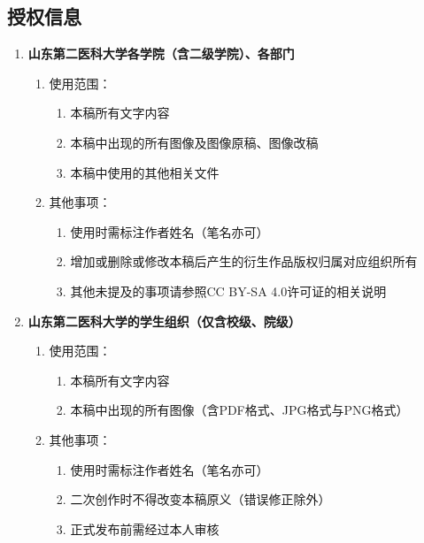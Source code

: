 \subsection[授权信息]{授权信息}
\begin{enumerate}
    \item \textbf{山东第二医科大学各学院（含二级学院）、各部门}
          \begin{enumerate}
              \item 使用范围：
                    \begin{enumerate}
                        \item 本稿所有文字内容
                        \item 本稿中出现的所有图像及图像原稿、图像改稿
                        \item 本稿中使用的其他相关文件
                    \end{enumerate}
              \item 其他事项：
                    \begin{enumerate}
                        \item 使用时需标注作者姓名（笔名亦可）
                        \item 增加或删除或修改本稿后产生的衍生作品版权归属对应组织所有
                        \item 其他未提及的事项请参照CC BY-SA 4.0许可证的相关说明
                    \end{enumerate}
          \end{enumerate}
    \item \textbf{山东第二医科大学的学生组织（仅含校级、院级）}
          \begin{enumerate}
              \item 使用范围：
                    \begin{enumerate}
                        \item 本稿所有文字内容
                        \item 本稿中出现的所有图像（含PDF格式、JPG格式与PNG格式）
                    \end{enumerate}
              \item 其他事项：
                    \begin{enumerate}
                        \item 使用时需标注作者姓名（笔名亦可）
                        \item 二次创作时不得改变本稿原义（错误修正除外）
                        \item 正式发布前需经过本人审核

\end{enumerate}
\end{enumerate}
\end{enumerate}
